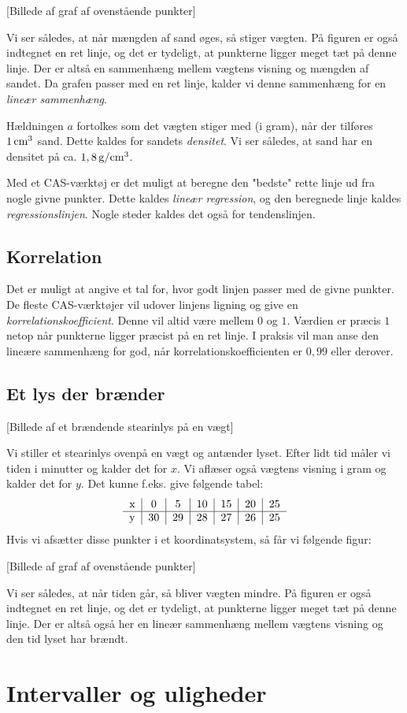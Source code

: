 \documentclass[12pt,oneside,a4paper]{article}
\begin{document}
[Billede af graf af ovenstående punkter]

Vi ser således, at når mængden af sand øges, så stiger vægten. 
På figuren er også indtegnet en ret linje, og det er tydeligt, at punkterne
ligger meget tæt på denne linje.  Der er altså en sammenhæng mellem vægtens
visning og mængden af sandet. Da grafen passer med en ret linje, kalder vi
denne sammenhæng for en {\em lineær sammenhæng}.

Hældningen $a$ fortolkes som det vægten stiger med (i gram), når der tilføres 
$1\, {\rm cm}^3$ sand. Dette kaldes for sandets {\em densitet}. Vi ser således, 
at sand har en densitet på ca. $1,8\, {\rm g}/{\rm cm}^3$.

Med et CAS-værktøj er det muligt at beregne den "bedste" rette linje ud fra
nogle givne punkter. Dette kaldes {\em lineær regression}, og den beregnede
linje kaldes {\em regressionslinjen}. Nogle steder kaldes det også for
tendenslinjen.

\subsection{Korrelation}
Det er muligt at angive et tal for, hvor godt linjen passer med de givne
punkter.  De fleste CAS-værktøjer vil udover linjens ligning og give en {\em
korrelationskoefficient}.  Denne vil altid være mellem $0$ og $1$. Værdien er
præcis $1$ netop når punkterne ligger præcist på en ret linje.  I praksis vil
man anse den lineære sammenhæng for god, når korrelationskoefficienten er
$0,99$ eller derover.


\subsection{Et lys der brænder}
[Billede af et brændende stearinlys på en vægt]

Vi stiller et stearinlys ovenpå en vægt og antænder lyset. Efter lidt tid måler
vi tiden i minutter og kalder det for $x$. Vi aflæser også vægtens visning i
gram og kalder det for $y$. Det kunne f.eks. give følgende tabel:
$$
\begin{tabular}{c|c|c|c|c|c|c}
    x &  0 &  5 & 10 & 15 & 20 & 25 \\
    \hline
    y & 30 & 29 & 28 & 27 & 26 & 25
\end{tabular}
$$
Hvis vi afsætter disse punkter i et koordinatsystem, så får vi følgende figur:

[Billede af graf af ovenstående punkter]

Vi ser således, at når tiden går, så bliver vægten mindre.
På figuren er også indtegnet en ret linje, og det er tydeligt, at punkterne
ligger meget tæt på denne linje.  Der er altså også her en lineær sammenhæng
mellem vægtens visning og den tid lyset har brændt.

\section{Intervaller og uligheder}
\end{document}
